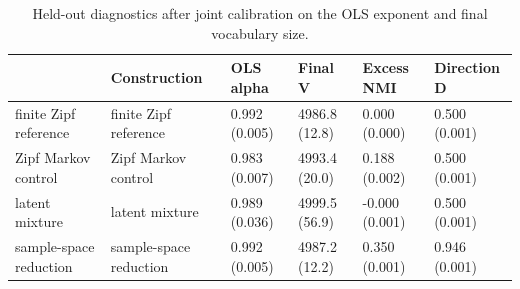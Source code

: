\begin{table}

\caption{\label{tab:joint-summary-table}Held-out diagnostics after joint calibration on the OLS exponent and final vocabulary size.}
\centering
\begin{tabular}[t]{llllll}
\toprule
  & Construction & OLS alpha & Final V & Excess NMI & Direction D\\
\midrule
finite Zipf reference & finite Zipf reference & 0.992 (0.005) & 4986.8 (12.8) & 0.000 (0.000) & 0.500 (0.001)\\
Zipf Markov control & Zipf Markov control & 0.983 (0.007) & 4993.4 (20.0) & 0.188 (0.002) & 0.500 (0.001)\\
latent mixture & latent mixture & 0.989 (0.036) & 4999.5 (56.9) & -0.000 (0.001) & 0.500 (0.001)\\
sample-space reduction & sample-space reduction & 0.992 (0.005) & 4987.2 (12.2) & 0.350 (0.001) & 0.946 (0.001)\\
\bottomrule
\end{tabular}
\end{table}
